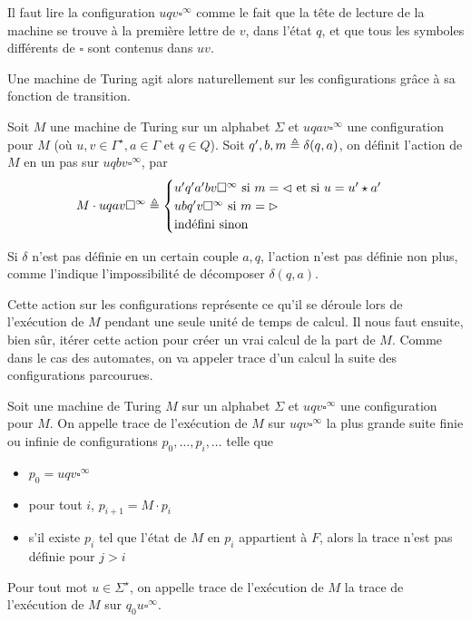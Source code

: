 Il faut lire la configuration $uqv\square^\infty$ comme le fait que la tête
de lecture de la machine se trouve à la première lettre de $v$, dans l'état $q$,
et que tous les symboles différents de $\square$ sont contenus dans $uv$.

Une machine de Turing agit alors naturellement sur les configurations grâce à sa
fonction de transition.

\begin{definition}
  Soit $M$ une machine de Turing sur un alphabet $\Sigma$ et
  $uqav\square^\infty$ une configuration pour $M$
  (où $u,v \in \Gamma^\star, a\in \Gamma$ et $q \in Q$). Soit
  $q',b,m \triangleq \delta(q,a)$, on définit l'action de $M$ en un pas sur
  $uqbv\square^\infty$, par
  \[
  M\cdot uqav\square^\infty \triangleq
  \begin{cases}
    u'q'a'bv\square^\infty\text{ si } m = \lhd\text{ et si } u = u'\star a'\\
    ubq'v\square^\infty\text{ si } m = \rhd \\
    \text{indéfini sinon}
  \end{cases}\]
\end{definition}

\begin{remark}
  Si $\delta$ n'est pas définie en un certain couple $a,q$, l'action n'est pas
  définie non plus, comme l'indique l'impossibilité de décomposer $\delta(q,a)$.
\end{remark}

Cette action sur les configurations représente ce qu'il se déroule lors de
l'exécution de $M$ pendant une seule unité de temps de calcul. Il nous faut
ensuite, bien sûr, itérer cette action pour créer un vrai calcul de la part de
$M$. Comme dans le cas des automates, on va appeler trace d'un calcul la suite
des configurations parcourues.

\begin{definition}
  Soit une machine de Turing $M$ sur un alphabet $\Sigma$ et
  $uqv\square^\infty$ une configuration pour $M$. On appelle trace de
  l'exécution de $M$ sur $uqv\square^\infty$ la plus grande suite finie ou
  infinie de configurations $p_0,\ldots,p_i,\ldots$ telle que
  \begin{itemize}
  \item $p_0 = uqv\square^\infty$
  \item pour tout $i$, $p_{i+1} = M\cdot p_i$
  \item s'il existe $p_i$ tel que l'état de $M$ en $p_i$ appartient à $F$,
    alors la trace n'est pas définie pour $j > i$
  \end{itemize}

  Pour tout mot $u \in \Sigma^\star$, on appelle trace de l'exécution de $M$
  la trace de l'exécution de $M$ sur $q_0u\square^\infty$.
\end{definition}


